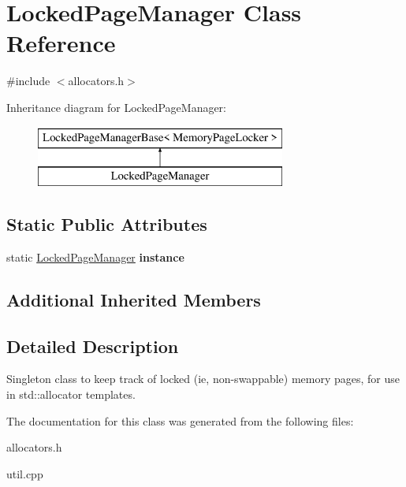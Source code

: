 \hypertarget{class_locked_page_manager}{}\section{Locked\+Page\+Manager Class Reference}
\label{class_locked_page_manager}


{\ttfamily \#include $<$allocators.\+h$>$}

Inheritance diagram for Locked\+Page\+Manager\+:\begin{figure}[H]
\begin{center}
\leavevmode
\includegraphics[height=2.000000cm]{class_locked_page_manager}
\end{center}
\end{figure}
\subsection*{Static Public Attributes}
\begin{DoxyCompactItemize}
\item 
\mbox{\label{class_locked_page_manager_aedd82df65c12c1d83d43ac8500c57fcf}} 
static \mbox{\hyperlink{class_locked_page_manager}{Locked\+Page\+Manager}} {\bfseries instance}
\end{DoxyCompactItemize}
\subsection*{Additional Inherited Members}


\subsection{Detailed Description}
Singleton class to keep track of locked (ie, non-\/swappable) memory pages, for use in std\+::allocator templates. 

The documentation for this class was generated from the following files\+:\begin{DoxyCompactItemize}
\item 
allocators.\+h\item 
util.\+cpp\end{DoxyCompactItemize}
